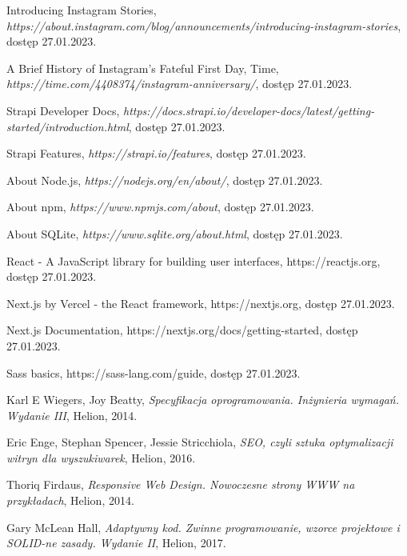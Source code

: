 \documentclass[a4paper, 12pt, twoside]{article}
\numberwithin{figure}{section}
\begin{document}
\begin{sloppypar}
\begin{thebibliography}{99}
    Introducing Instagram Stories,
    \textit{https://about.instagram.com/blog/announcements/introducing-instagram-stories},
    dostęp 27.01.2023.

    A Brief History of Instagram's Fateful First Day, Time,
    \textit{https://time.com/4408374/instagram-anniversary/},
    dostęp 27.01.2023.

    Strapi Developer Docs,
    \textit{https://docs.strapi.io/developer-docs/latest/getting-started/introduction.html},
    dostęp 27.01.2023.

    Strapi Features,
    \textit{https://strapi.io/features},
    dostęp 27.01.2023.

    About Node.js,
    \textit{https://nodejs.org/en/about/},
    dostęp 27.01.2023.

    About npm,
    \textit{https://www.npmjs.com/about},
    dostęp 27.01.2023.

    About SQLite,
    \textit{https://www.sqlite.org/about.html},
    dostęp 27.01.2023.

    React - A JavaScript library for building user interfaces,
    {https://reactjs.org},
    dostęp 27.01.2023.

    Next.js by Vercel - the React framework,
    {https://nextjs.org},
    dostęp 27.01.2023. 

    Next.js Documentation,
    {https://nextjs.org/docs/getting-started},
    dostęp 27.01.2023.

    Sass basics,
    {https://sass-lang.com/guide},
    dostęp 27.01.2023.

    Karl E Wiegers, Joy Beatty,
    \textit{Specyfikacja oprogramowania. Inżynieria wymagań. Wydanie III},
    Helion,
    2014.
    
    Eric Enge, Stephan Spencer, Jessie Stricchiola,
    \textit{SEO, czyli sztuka optymalizacji witryn dla wyszukiwarek},
    Helion,
    2016.

    Thoriq Firdaus,
    \textit{Responsive Web Design. Nowoczesne strony WWW na przykładach},
    Helion, 
    2014.

    Gary McLean Hall,
    \textit{Adaptywny kod. Zwinne programowanie, wzorce projektowe i SOLID-ne zasady. Wydanie II},
    Helion,
    2017.

        
\end{thebibliography}

\end{sloppypar}
\end{document}
